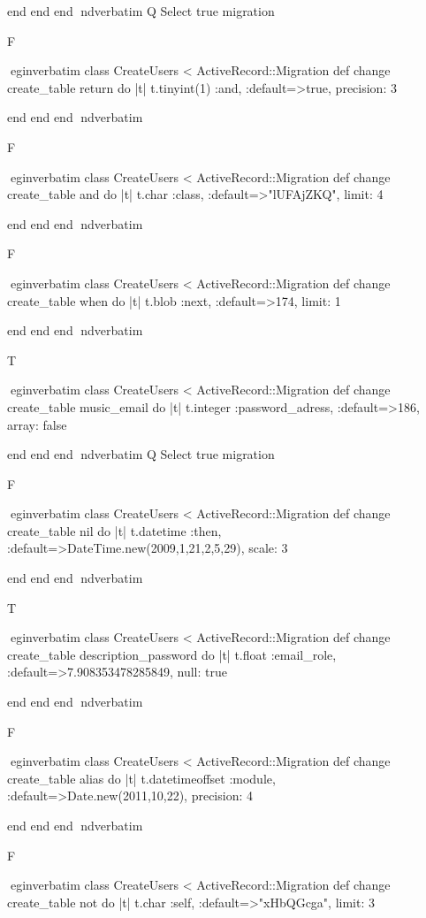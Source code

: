     end 
  end 
end
nd{verbatim}
Q
 Select true migration

F

egin{verbatim}
 class CreateUsers < ActiveRecord::Migration 
  def change 
    create_table return do |t| 
      t.tinyint(1) :and, :default=>true, precision: 3
    
    end 
  end 
end
nd{verbatim}

F

egin{verbatim}
 class CreateUsers < ActiveRecord::Migration 
  def change 
    create_table and do |t| 
      t.char :class, :default=>"lUFAjZKQ", limit: 4
    
    end 
  end 
end
nd{verbatim}

F

egin{verbatim}
 class CreateUsers < ActiveRecord::Migration 
  def change 
    create_table when do |t| 
      t.blob :next, :default=>174, limit: 1
    
    end 
  end 
end
nd{verbatim}

T

egin{verbatim}
 class CreateUsers < ActiveRecord::Migration 
  def change 
    create_table music_email do |t| 
      t.integer :password_adress, :default=>186, array: false
    
    end 
  end 
end
nd{verbatim}
Q
 Select true migration

F

egin{verbatim}
 class CreateUsers < ActiveRecord::Migration 
  def change 
    create_table nil do |t| 
      t.datetime :then, :default=>DateTime.new(2009,1,21,2,5,29), scale: 3
    
    end 
  end 
end
nd{verbatim}

T

egin{verbatim}
 class CreateUsers < ActiveRecord::Migration 
  def change 
    create_table description_password do |t| 
      t.float :email_role, :default=>7.908353478285849, null: true
    
    end 
  end 
end
nd{verbatim}

F

egin{verbatim}
 class CreateUsers < ActiveRecord::Migration 
  def change 
    create_table alias do |t| 
      t.datetimeoffset :module, :default=>Date.new(2011,10,22), precision: 4
    
    end 
  end 
end
nd{verbatim}

F

egin{verbatim}
 class CreateUsers < ActiveRecord::Migration 
  def change 
    create_table not do |t| 
      t.char :self, :default=>"xHbQGcga", limit: 3
    
